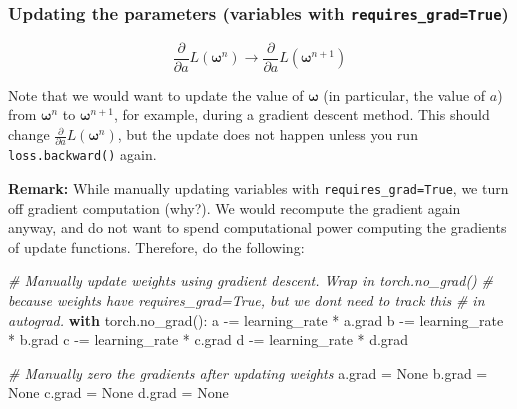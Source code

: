 \documentclass[
]{article}
\newenvironment{Shaded}{}{}
\newcommand{\CommentTok}[1]{\textcolor[rgb]{0.38,0.63,0.69}{\textit{#1}}}
\newcommand{\ControlFlowTok}[1]{\textcolor[rgb]{0.00,0.44,0.13}{\textbf{#1}}}
\newcommand{\NormalTok}[1]{#1}
\newcommand{\OperatorTok}[1]{\textcolor[rgb]{0.40,0.40,0.40}{#1}}
\newcommand{\VariableTok}[1]{\textcolor[rgb]{0.10,0.09,0.49}{#1}}
\newcommand{\1}{\boldsymbol{1}}
\begin{document}
\hypertarget{updating-the-parameters-variables-with-requires_gradtrue}{%
\subsubsection{\texorpdfstring{Updating the parameters (variables with
\texttt{requires\_grad=True})}{Updating the parameters (variables with requires\_grad=True)}}\label{updating-the-parameters-variables-with-requires_gradtrue}}

\[\frac{\partial}{\partial a}L(\boldsymbol{\omega}^n)
\to \frac{\partial}{\partial a}L(\boldsymbol{\omega}^{n+1})\]

Note that we would want to update the value of \(\boldsymbol{\omega}\)
(in particular, the value of \(a\)) from \(\boldsymbol{\omega}^n\) to
\(\boldsymbol{\omega}^{n+1}\), for example, during a gradient descent
method. This should change
\(\frac{\partial}{\partial a}L(\boldsymbol{\omega}^n)\), but the update
does not happen unless you run \texttt{loss.backward()} again.

\textbf{Remark:} While manually updating variables with
\texttt{requires\_grad=True}, we turn off gradient computation (why?).
We would recompute the gradient again anyway, and do not want to spend
computational power computing the gradients of update functions.
Therefore, do the following:

\begin{Shaded}
\begin{Highlighting}[]
\CommentTok{\# Manually update weights using gradient descent. Wrap in torch.no\_grad()}
\CommentTok{\# because weights have requires\_grad=True, but we don\textquotesingle{}t need to track this}
\CommentTok{\# in autograd.}
\ControlFlowTok{with}\NormalTok{ torch.no\_grad():}
\NormalTok{    a }\OperatorTok{{-}=}\NormalTok{ learning\_rate }\OperatorTok{*}\NormalTok{ a.grad}
\NormalTok{    b }\OperatorTok{{-}=}\NormalTok{ learning\_rate }\OperatorTok{*}\NormalTok{ b.grad}
\NormalTok{    c }\OperatorTok{{-}=}\NormalTok{ learning\_rate }\OperatorTok{*}\NormalTok{ c.grad}
\NormalTok{    d }\OperatorTok{{-}=}\NormalTok{ learning\_rate }\OperatorTok{*}\NormalTok{ d.grad}

    \CommentTok{\# Manually zero the gradients after updating weights}
\NormalTok{    a.grad }\OperatorTok{=} \VariableTok{None}
\NormalTok{    b.grad }\OperatorTok{=} \VariableTok{None}
\NormalTok{    c.grad }\OperatorTok{=} \VariableTok{None}
\NormalTok{    d.grad }\OperatorTok{=} \VariableTok{None}
\end{Highlighting}
\end{Shaded}
\end{document}
